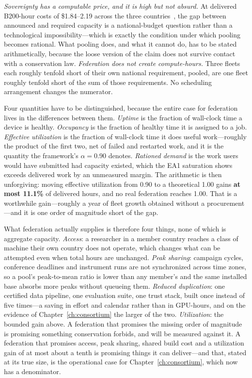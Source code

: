 \emph{Sovereignty has a computable price, and it is high but not absurd.} At delivered B200-hour costs of \$1.84--2.19 across the three countries~\cite{ai4s-framework}, the gap between announced and required capacity is a national-budget question rather than a technological impossibility---which is exactly the condition under which pooling becomes rational. What pooling does, and what it cannot do, has to be stated arithmetically, because the loose version of the claim does not survive contact with a conservation law. \emph{Federation does not create compute-hours.} Three fleets each roughly tenfold short of their own national requirement, pooled, are one fleet roughly tenfold short of the sum of those requirements. No scheduling arrangement changes the numerator.

Four quantities have to be distinguished, because the entire case for federation lives in the differences between them. \emph{Uptime} is the fraction of wall-clock time a device is healthy. \emph{Occupancy} is the fraction of healthy time it is assigned to a job. \emph{Effective utilization} is the fraction of wall-clock time it does useful work---roughly the product of the first two, net of failed and restarted work, and it is the quantity the framework's $\alpha = 0.90$ denotes. \emph{Rationed demand} is the work users would have submitted had capacity existed, which the EA1 saturation shows exceeds delivered work by an unmeasured margin. The arithmetic is then unforgiving: moving effective utilization from 0.90 to a theoretical 1.00 gains \textbf{at most 11.1\%} of delivered hours, and no real federation reaches 1.00. That is a worthwhile gain---roughly a year of fleet growth obtained without a procurement---and it is one order of magnitude short of the gap.

What federation actually supplies is therefore four things, none of which is aggregate capacity. \emph{Access}: a researcher in a member country reaches a class of machine their own country does not operate, which changes what can be attempted even when total hours are unchanged. \emph{Peak sharing}: campaign cycles, conference deadlines and instrument runs are not synchronized across time zones, so a pool's peak-to-mean ratio is lower than any member's and the same installed base absorbs more peaks without queueing them. \emph{Reduced duplication}: one certified data pipeline, one evaluation suite, one trust stack, built once instead of five times---a saving in effort and calendar rather than in GPU-hours, and on the evidence of Chapter~\ref{ch:consortium} the larger of the two. \emph{Utilization}: the bounded gain above. A federation that promises the missing order of magnitude is promising something conservation forbids, and will be measured against it. A federation that promises access, peak sharing, shared build cost and a utilization gain of at most about a tenth is promising things it can deliver---and that, stated at its true size, is the operational case for Chapter~\ref{ch:consortium}, which now has a denominator.

